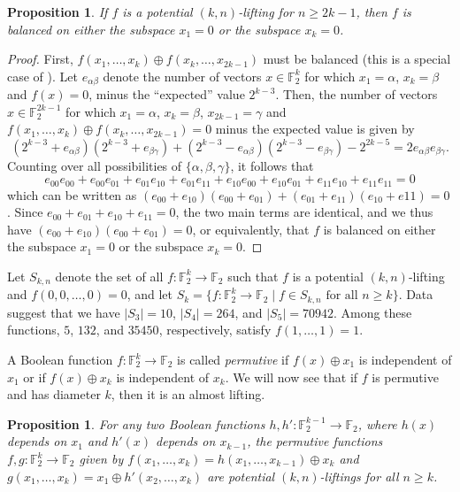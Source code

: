 \documentclass[11pt,english,a4paper]{amsart}
\theoremstyle{plain}
\newtheorem{proposition}[theorem]{Proposition}
\theoremstyle{definition}
\newtheorem{definition}[theorem]{Definition}
\theoremstyle{remark}
\newcommand{\F}{\mathbb{F}}
\begin{document}
  \begin{proposition}
  If $f$ is a potential $(k,n)$-lifting for $n\geq 2k-1$, then $f$ is balanced on either the subspace $x_1 = 0$ or the subspace $x_k=0$.
    \end{proposition}
  \begin{proof}
  First, $f(x_1, \dotsc, x_k) \oplus f(x_k, \dotsc, x_{2k-1})$ must be balanced (this is a special case of \cite[Proposition~35]{carlet-book}). Let $e_{\alpha \beta}$ denote the number of vectors $x \in \F_2^k$ for which $x_1=\alpha$, $x_k=\beta$ and $f(x)=0$, minus the ``expected'' value $2^{k-3}$. Then, the number of vectors $x \in \F_2^{2k-1}$ for which $x_1 = \alpha$, $x_k = \beta$, $x_{2k-1}=\gamma$ and $f(x_1, \dotsc, x_k) \oplus f(x_k, \dotsc, x_{2k-1}) = 0$ minus the expected value is given by $$\left( 2^{k-3} + e_{\alpha \beta} \right) \left( 2^{k-3} + e_{\beta \gamma} \right) + \left( 2^{k-3} - e_{\alpha \beta} \right) \left( 2^{k-3} - e_{\beta \gamma} \right) - 2^{2k-5} = 2e_{\alpha \beta} e_{\beta \gamma}.$$ Counting over all possibilities of $\{ \alpha, \beta, \gamma \}$, it follows that $$e_{00} e_{00} + e_{00} e_{01} + e_{01} e_{10} + e_{01} e_{11} + e_{10} e_{00} + e_{10} e_{01} + e_{11} e_{10} + e_{11} e_{11} = 0$$ which can be written as $(e_{00} + e_{10})(e_{00} + e_{01}) + (e_{01} + e_{11})(e_{10} + e{11}) = 0$. Since $e_{00} + e_{01} + e_{10} + e_{11} = 0$, the two main terms are identical, and we thus have $(e_{00} + e_{10})(e_{00} + e_{01}) = 0$, or equivalently, that $f$ is balanced on either the subspace $x_1 = 0$ or the subspace $x_k=0$.
	\end{proof}
	
	Let $S_{k, n}$ denote the set of all $f\colon \F_2^k\to\F_2$ such that $f$ is a potential $(k,n)$-lifting and $f(0, 0, \dotsc , 0) = 0$, and let $S_k = \{ f\colon \F_2^k\to\F_2 \mid f \in S_{k, n} \text{ for all } n\geq k\}$. Data suggest that we have $\lvert S_3\rvert=10$, $\lvert S_4\rvert=264$, and $\rvert S_5\rvert=70942$. Among these functions, $5$, $132$, and $35450$, respectively, satisfy $f(1, \dotsc, 1)=1$.

\medskip
    A Boolean function $f\colon\F_2^k\to\F_2$ is called \emph{permutive} if $f(x)\oplus x_1$ is independent of $x_1$ or if $f(x)\oplus x_k$ is independent of $x_k$. We will now see that if $f$ is permutive and has diameter $k$, then it is an almost lifting.
 
	\begin{proposition}\label{permutive}
		For any two Boolean functions $h, h'\colon\F_2^{k-1} \to \F_2$, where $h(x)$ depends on $x_1$ and $h'(x)$ depends on $x_{k-1}$, the permutive functions $f, g\colon\F_2^k \to \F_2$ given by $f(x_1, \dotsc, x_k) = h(x_1, \dotsc, x_{k-1}) \oplus x_k$ and $g(x_1, \dotsc, x_k) = x_1 \oplus h'(x_2, \dotsc, x_k)$ are potential $(k, n)$-liftings for all $n \geq k$.
	\end{proposition}
	
\end{document}
